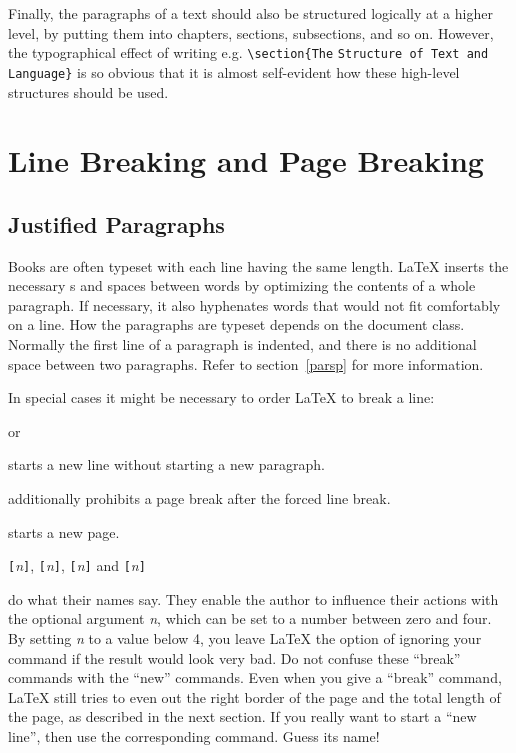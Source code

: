 Finally, the paragraphs of a text should also be structured logically
at a higher level, by putting them into chapters, sections,
subsections, and so on.  However, the typographical effect of writing
e.g.{} \verb|\section{The| \texttt{Structure of Text and Language}\verb|}| is
so obvious that it is almost self-evident how these high-level
structures should be used.

\section{Line Breaking and Page Breaking}
 
\subsection{Justified Paragraphs}

Books are often typeset with each line having the same length.
\LaTeX{} inserts the necessary s and spaces between words
by optimizing the contents of a whole paragraph. If necessary, it
also hyphenates words that would not fit comfortably on a line.
How the paragraphs are typeset depends on the document class.
Normally the first line of a paragraph is indented, and there is no
additional space between two paragraphs. Refer to section~\ref{parsp}
for more information.

In special cases it might be necessary to order \LaTeX{} to break a
line: 
\begin{lscommand}
\ci{\bs} or  
\end{lscommand}
\noindent starts a new line without starting a new paragraph. 

\begin{lscommand}
\ci{\bs*}
\end{lscommand}
\noindent additionally prohibits a page break after the forced
line break. 

\begin{lscommand}
\end{lscommand}
\noindent starts a new page. 

\begin{lscommand}
\verb|[|\emph{n}\verb|]|,
\verb|[|\emph{n}\verb|]|, 
\verb|[|\emph{n}\verb|]| and
\verb|[|\emph{n}\verb|]|
\end{lscommand}
\noindent do what their names say. They enable the author to influence their
actions with the optional argument \emph{n}, which can be set to a number
between zero and four. By setting \emph{n} to a value below 4, you leave
\LaTeX{} the option of ignoring your command if the result would look very
bad. Do not confuse these ``break'' commands with the ``new'' commands. Even
when you give a ``break'' command, \LaTeX{} still tries to even out the
right border of the page and the total length of the page, as described in
the next section. If you really want to start a ``new line'', then use the
corresponding command. Guess its name!

